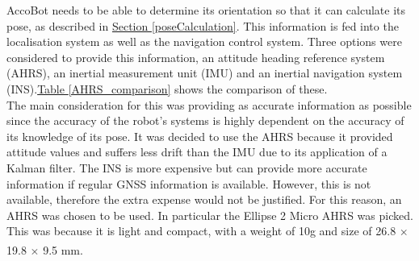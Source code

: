 \documentclass[11pt]{article}		%
\newcommand{\supercite}[1]{\textsuperscript{\cite{#1}}}		%
\newcommand{\tableref}[1]{\hyperref[#1]{Table \ref*{#1}}}     %
\newcommand{\sectref}[1]{\hyperref[#1]{Section \ref*{#1}}}     %
\begin{document}
            AccoBot needs to be able to determine its orientation so that it can calculate its pose, as described in \sectref{poseCalculation}. This information is fed into the localisation system as well as the navigation control system. Three options were considered to provide this information, an attitude heading reference system (AHRS), an inertial measurement unit (IMU) and an inertial navigation system (INS).\tableref{AHRS_comparison} shows the comparison of these.
            \\
            \hspace*{3ex}The main consideration for this was providing as accurate information as possible since the accuracy of the robot’s systems is highly dependent on the accuracy of its knowledge of its pose. It was decided to use the AHRS because it provided attitude values and suffers less drift than the IMU due to its application of a Kalman filter. The INS is more expensive but can provide more accurate information if regular GNSS information is available. However, this is not available, therefore the extra expense would not be justified. For this reason, an AHRS was chosen to be used. In particular the Ellipse 2 Micro AHRS was picked. This was because it is light and compact, with a weight of 10g and size of 26.8 $\times$ 19.8 $\times$ 9.5 mm.\supercite{Ellipse_Ahrs}
\end{document}
